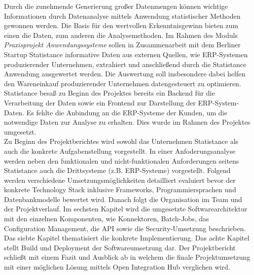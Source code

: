 Durch die zunehmende Generierung großer Datenmengen können wichtige Informationen durch Datenanalyse mittels Anwendung statistischer Methoden gewonnen werden. Die Basis für den wertvollen Erkenntnisgewinn bieten zum einen die Daten, zum anderen die Analysemethoden. Im Rahmen des Moduls \textit{Praxisprojekt Anwendungssysteme} sollen in Zusammenarbeit mit dem Berliner Startup Statistance informative Daten aus externen Quellen, wie ERP-Systemen produzierender Unternehmen, extrahiert und anschließend durch die Statistance Anwendung ausgewertet werden. Die Auswertung soll insbesondere dabei helfen den Wareneinkauf produzierender Unternehmen datengesteuert zu optimieren. Statistance besaß zu Beginn des Projektes bereits ein Backend für die Verarbeitung der Daten sowie ein Frontend zur Darstellung der ERP-System-Daten. Es fehlte die Anbindung an die ERP-Systeme der Kunden, um die notwendige Daten zur Analyse zu erhalten. Dies wurde im Rahmen des Projektes umgesetzt. \\
Zu Beginn des Projektberichtes wird sowohl das Unternehmen Statistance als auch die konkrete Aufgabenstellung vorgestellt. In einer Anfoderungsanalyse werden neben den funktionalen und nicht-funktionalen Anforderungen seitens Statistance auch die Drittsysteme (z.B. ERP-Systeme) vorgestellt. Folgend werden verschiedene Umsetzungsmöglichkeiten detailliert evaluiert bevor der konkrete Technology Stack inklusive Frameworks, Programmiersprachen und Datenbankmodelle bewertet wird. Danach folgt die Organisation im Team und der Projektverlauf. Im sechsten Kapitel wird die umgesetzte Softwarearchitektur mit den einzelnen Komponenten, wie Konnektoren, Batch-Jobs, das Configuration Management, die API sowie die Security-Umsetzung beschrieben. Das siebte Kapitel thematisiert die konkrete Implementierung. Das achte Kapitel stellt Build und Deployment der Softwareumsetzung dar. Der Projektbericht schließt mit einem Fazit und Ausblick ab in welchem die finale Projektumsetzung mit einer möglichen Lösung mittels Open Integration Hub verglichen wird.

\newpage


